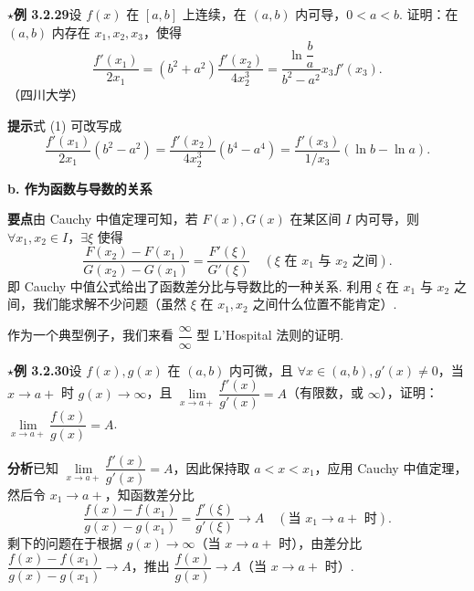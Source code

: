 \documentclass[UTF8, 12pt, fontset=fandol, oneside]{ctexart}
\begin{document}
\noindent\textbf{$\star$例 3.2.29}\quad 设 $f(x)$ 在 $[a,b]$ 上连续，在 $(a,b)$ 内可导，$0<a<b$. 证明：在 $(a,b)$ 内存在 $x_1,x_2,x_3$，使得
\begin{equation}
  \frac{f'(x_1)}{2x_1}
  =(b^2+a^2)\frac{f'(x_2)}{4x_2^3}
  =\frac{\ln\dfrac ba}{b^2-a^2}x_3f'(x_3).
\tag{1}
\end{equation}
（四川大学）

\noindent\textbf{提示}\quad 式 (1) 可改写成
\[
  \frac{f'(x_1)}{2x_1}(b^2-a^2)
  =
  \frac{f'(x_2)}{4x_2^3}(b^4-a^4)
  =
  \frac{f'(x_3)}{1/x_3}(\ln b-\ln a).
\]

\noindent\textbf{b. 作为函数与导数的关系}

\noindent\textbf{要点}\quad 由 Cauchy 中值定理可知，若 $F(x),G(x)$ 在某区间 $I$ 内可导，则 $\forall x_1,x_2\in I$，$\exists\xi$ 使得
\[
  \frac{F(x_2)-F(x_1)}{G(x_2)-G(x_1)}=\frac{F'(\xi)}{G'(\xi)}
  \quad(\xi\text{ 在 }x_1\text{ 与 }x_2\text{ 之间}).
\]
即 Cauchy 中值公式给出了函数差分比与导数比的一种关系. 利用 $\xi$ 在 $x_1$ 与 $x_2$ 之间，我们能求解不少问题（虽然 $\xi$ 在 $x_1,x_2$ 之间什么位置不能肯定）.

作为一个典型例子，我们来看 $\dfrac{\infty}{\infty}$ 型 L'Hospital 法则的证明.

\noindent\textbf{$\star$例 3.2.30}\quad 设 $f(x),g(x)$ 在 $(a,b)$ 内可微，且 $\forall x\in(a,b),g'(x)\ne0$，当 $x\to a+$ 时 $g(x)\to\infty$，且 $\lim\limits_{x\to a+}\dfrac{f'(x)}{g'(x)}=A$（有限数，或 $\infty$），证明：$\lim\limits_{x\to a+}\dfrac{f(x)}{g(x)}=A$.

\noindent\textbf{分析}\quad 已知 $\lim\limits_{x\to a+}\dfrac{f'(x)}{g'(x)}=A$，因此保持取 $a<x<x_1$，应用 Cauchy 中值定理，然后令 $x_1\to a+$，知函数差分比
\begin{equation}
  \frac{f(x)-f(x_1)}{g(x)-g(x_1)}=\frac{f'(\xi)}{g'(\xi)}\to A\quad(\text{当 }x_1\to a+\text{ 时}).
\tag{1}
\end{equation}
剩下的问题在于根据 $g(x)\to\infty$（当 $x\to a+$ 时），由差分比 $\dfrac{f(x)-f(x_1)}{g(x)-g(x_1)}\to A$，推出 $\dfrac{f(x)}{g(x)}\to A$（当 $x\to a+$ 时）.
\end{document}
